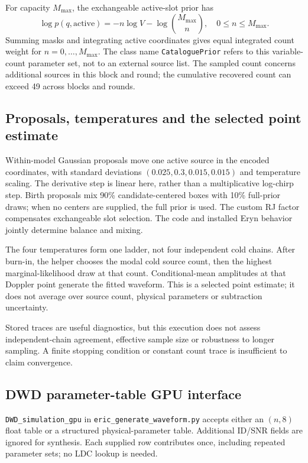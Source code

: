\documentclass[11pt,a4paper]{article}
\newcommand{\code}[1]{\texttt{\nolinkurl{#1}}}
\begin{document}
For capacity \(M_{\max}\), the exchangeable active-slot prior has
\[
\log p(q,\mathrm{active})
=-n\log V-\log\binom{M_{\max}}n,
\quad 0\leq n\leq M_{\max}.
\]
Summing masks and integrating active coordinates gives equal integrated count
weight for \(n=0,\ldots,M_{\max}\). The class name \code{CataloguePrior}
refers to this variable-count parameter set, not to an external source list.
The sampled count concerns additional sources in this block and round; the
cumulative recovered count can exceed 49 across blocks and rounds.

\subsection{Proposals, temperatures and the selected point estimate}

Within-model Gaussian proposals move one active source in the encoded
coordinates, with standard deviations \((0.025,0.3,0.015,0.015)\) and temperature
scaling. The derivative step is linear here, rather than a multiplicative
log-chirp step. Birth proposals mix 90\% candidate-centered boxes with 10\%
full-prior draws; when no centers are supplied, the full prior is used.
The custom RJ factor compensates exchangeable slot selection. The code and
installed Eryn behavior jointly determine balance and mixing.

The four temperatures form one ladder, not four independent cold chains.
After burn-in, the helper chooses the modal cold source count, then the
highest marginal-likelihood draw at that count. Conditional-mean amplitudes
at that Doppler point generate the fitted waveform. This is a selected
point estimate; it does not average over source count, physical parameters
or subtraction uncertainty.

Stored traces are useful diagnostics, but this execution does not assess
independent-chain agreement, effective sample size or robustness to longer
sampling. A finite stopping condition or constant count trace is insufficient
to claim convergence.

\subsection{DWD parameter-table GPU interface}
\label{sec:gpu_api}

\code{DWD_simulation_gpu} in \code{eric_generate_waveform.py} accepts either
an \((n,8)\) float table or a structured physical-parameter table. Additional
ID/SNR fields are ignored for synthesis. Each supplied row contributes once,
including repeated parameter sets; no LDC lookup is needed.
\end{document}
